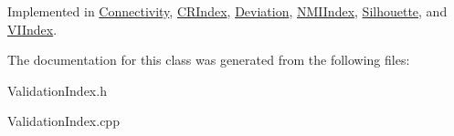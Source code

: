 Implemented in \hyperlink{classConnectivity_ae132296aae336b3e3830431592611a74}{Connectivity}, \hyperlink{classCRIndex_a384b9fc6a5d271c13f7b599f17771041}{CRIndex}, \hyperlink{classDeviation_aefedb81474f0d06827a2ceaecd93f43c}{Deviation}, \hyperlink{classNMIIndex_a930fb32a05cbba0f427510536c204694}{NMIIndex}, \hyperlink{classSilhouette_af8817c1accb7b60814cfff988c9ccc05}{Silhouette}, and \hyperlink{classVIIndex_a0d43fc7805b4c05b97cea7c850216f5f}{VIIndex}.

The documentation for this class was generated from the following files:\begin{DoxyCompactItemize}
\item 
ValidationIndex.h\item 
ValidationIndex.cpp\end{DoxyCompactItemize}
